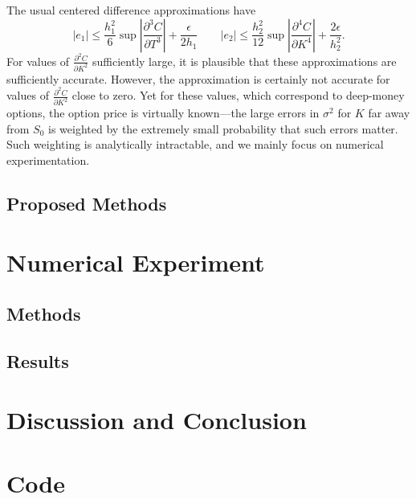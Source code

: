 \documentclass[12pt]{article}
\numberwithin{equation}{section}
\newcommand{\diff}[2]{\frac{\partial #1}{\partial #2}}
\newcommand{\abs}[1]{\left|#1\right|}
\begin{document}
The usual centered difference approximations have
\[
|e_1|\le \frac{h_1^2}{6}\sup \abs{\diff{^3C}{T^3}} + \frac{\epsilon}{2h_1}
\qquad |e_2| \le \frac{h_2^2}{12}\sup \abs{\diff{^4C}{K^4}} +
\frac{2\epsilon}{h_2^2}.
\]
For values of $\diff{^2C}{K^2}$ sufficiently large, it is plausible that these
approximations are sufficiently accurate. However, the approximation is
certainly not accurate for values of $\diff{^2C}{K^2}$ close to zero. Yet for
these values, which correspond to deep-money options, the option price is
virtually known---the large errors in $\sigma^2$ for $K$ far away from $S_0$ is
weighted by the extremely small probability that such errors matter. Such
weighting is analytically intractable, and we mainly focus on numerical
experimentation. 
 
\subsection{Proposed Methods}


 
\section{Numerical Experiment}

\subsection{Methods}

\subsection{Results}


\section{Discussion and Conclusion}





\newpage

\appendix
\appendixpage

\section{Code}






\end{document}

